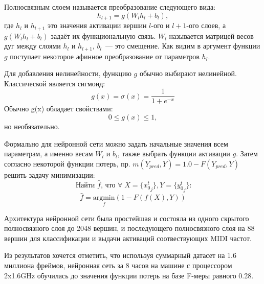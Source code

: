 \documentclass[unicode]{beamer}
\begin{document}
\begin{frame}
  Полносвязным слоем называется преобразование следующего вида:
  \[
    h_{l + 1} = g(W_l h_l + b_l),
  \]
  где $h_l$ и $h_{l + 1}$ это значения активации вершин $l$-ого и  $l+1$-ого слоев,
  а $g(W_l h_l + b_l)$ задаёт их функциональную связь.
  $W_l$ называется матрицей весов дуг
  между слоями $h_l$ и $h_{l + 1}$, $b_l$~--- это смещение. Как видим
  в аргумент функции $g$ поступает некоторое афинное преобразование
  от параметров $h_l$.
\end{frame}

\begin{frame}
  Для добавления нелинейности, функцию $g$ обычно выбирают нелинейной.
  Классической является сигмоид:
  \[
    g(x) = \sigma (x) = \frac{1}{1 + e^{-x}}
  \]
  Обычно g(x) обладает свойствами:
  \[
    0 \leq  g(x) \leq 1,
  \]
  но необязательно.
\end{frame}

\begin{frame}
  Формально для нейронной сети можно задать начальные значения всем параметрам,
  а именно весам $W_l$ и $b_l$, также выбрать функции активации $g$.
  Затем согласно некоторой функции потерь,
  пр. $m(Y_{pred}, Y) = 1.0 - F(Y_{pred}, Y)$
  решить задачу минимизации:
  \[
    \text{ Найти $\hat f$, что } \forall \; X=\{{x_0^t}_j\}, Y=\{{y_0^t}_j\}:
  \]
  \[
    \hat f = \underset{f}{\text{argmin}}(1 - F(f(X), Y))
  \]
\end{frame}

\begin{frame}
  Архитектура нейронной сети была простейшая и состояла
  из одного скрытого полносвязного слоя до 2048 вершин,
  и последующего полносвязного слоя на 88 вершин для классификации
  и выдачи активаций соотвествующих MIDI частот.
\end{frame}

\begin{frame}
  Из результатов хочется отметить, что используя суммарный датасет на 1.6
  миллиона фреймов, нейронная сеть за 8 часов на машине с процессором
  2x1.6GHz обучилась до значения функции потерь на базе F-меры равного 0.28.
\end{frame}
\end{document}

